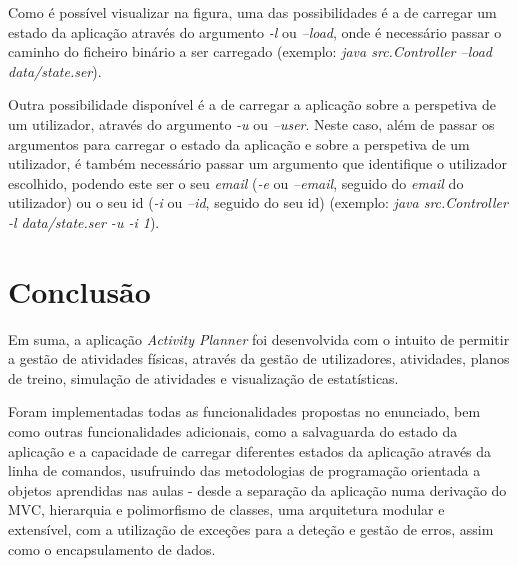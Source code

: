 \documentclass[a4paper,12pt]{scrreprt}
\begin{document}
    Como é possível visualizar na figura, uma das possibilidades é a de carregar um estado da aplicação através do argumento \textit{-l} ou \textit{--load}, onde é necessário passar o caminho do ficheiro binário a ser carregado (exemplo: \textit{java src.Controller --load data/state.ser}).

    Outra possibilidade disponível é a de carregar a aplicação sobre a perspetiva de um utilizador, através do argumento \textit{-u} ou \textit{--user}. Neste caso, além de passar os argumentos para carregar o estado da aplicação e sobre a perspetiva de um utilizador, é também necessário passar um argumento que identifique o utilizador escolhido, podendo este ser o seu \textit{email} (\textit{-e} ou \textit{--email}, seguido do \textit{email} do utilizador) ou o seu id (\textit{-i} ou \textit{--id}, seguido do seu id) (exemplo: \textit{java src.Controller -l data/state.ser -u -i 1}).




\chapter{Conclusão}
    Em suma, a aplicação \textit{Activity Planner} foi desenvolvida com o intuito de permitir a gestão de atividades físicas, através da gestão de utilizadores, atividades, planos de treino, simulação de atividades e visualização de estatísticas.

    Foram implementadas todas as funcionalidades propostas no enunciado, bem como outras funcionalidades adicionais, como a salvaguarda do estado da aplicação e a capacidade de carregar diferentes estados da aplicação através da linha de comandos, usufruindo das metodologias de programação orientada a objetos aprendidas nas aulas - desde a separação da aplicação numa derivação do MVC, hierarquia e polimorfismo de classes, uma arquitetura modular e extensível, com a utilização de exceções para a deteção e gestão de erros, assim como o encapsulamento de dados.

\end{document}
